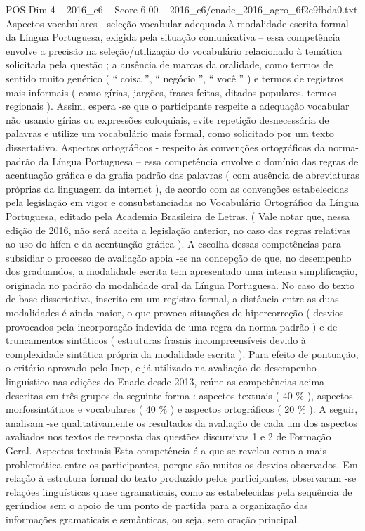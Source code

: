 \begin{textsample}{POS Dim 4 – 2016\_c6 – Score 6.00 – 2016\_c6/enade\_2016\_agro\_6f2e9fbda0.txt}
Aspectos vocabulares - seleção vocabular adequada à modalidade escrita formal da Língua Portuguesa, exigida pela situação comunicativa – essa competência envolve a precisão na seleção/utilização do vocabulário relacionado à temática solicitada pela questão ; a ausência de marcas da oralidade, como termos de sentido muito genérico ( “ coisa ”, “ negócio ”, “ você ” ) e termos de registros mais informais ( como gírias, jargões, frases feitas, ditados populares, termos regionais ).
Assim, espera -se que o participante respeite a adequação vocabular não usando gírias ou expressões coloquiais, evite repetição desnecessária de palavras e utilize um vocabulário mais formal, como solicitado por um texto dissertativo.
Aspectos ortográficos - respeito às convenções ortográficas da norma-padrão da Língua Portuguesa – essa competência envolve o domínio das regras de acentuação gráfica e da grafia padrão das palavras ( com ausência de abreviaturas próprias da linguagem da internet ), de acordo com as convenções estabelecidas pela legislação em vigor e consubstanciadas no Vocabulário Ortográfico da Língua Portuguesa, editado pela Academia Brasileira de Letras. ( Vale notar que, nessa edição de 2016, não será aceita a legislação anterior, no caso das regras relativas ao uso do hífen e da acentuação gráfica ).
A escolha dessas competências para subsidiar o processo de avaliação apoia -se na concepção de que, no desempenho dos graduandos, a modalidade escrita tem apresentado uma intensa simplificação, originada no padrão da modalidade oral da Língua Portuguesa.
No caso do texto de base dissertativa, inscrito em um registro formal, a distância entre as duas modalidades é ainda maior, o que provoca situações de hipercorreção ( desvios provocados pela incorporação indevida de uma regra da norma-padrão ) e de truncamentos sintáticos ( estruturas frasais incompreensíveis devido à complexidade sintática própria da modalidade escrita ).
Para efeito de pontuação, o critério aprovado pelo Inep, e já utilizado na avaliação do desempenho linguístico nas edições do Enade desde 2013, reúne as competências acima descritas em três grupos da seguinte forma : aspectos textuais ( 40 \% ), aspectos morfossintáticos e vocabulares ( 40 \% ) e aspectos ortográficos ( 20 \% ).
A seguir, analisam -se qualitativamente os resultados da avaliação de cada um dos aspectos avaliados nos textos de resposta das questões discursivas 1 e 2 de Formação Geral.
Aspectos textuais Esta competência é a que se revelou como a mais problemática entre os participantes, porque são muitos os desvios observados.
Em relação à estrutura formal do texto produzido pelos participantes, observaram -se relações linguísticas quase agramaticais, como as estabelecidas pela sequência de gerúndios sem o apoio de um ponto de partida para a organização das informações gramaticais e semânticas, ou seja, sem oração principal.

\end{textsample}
